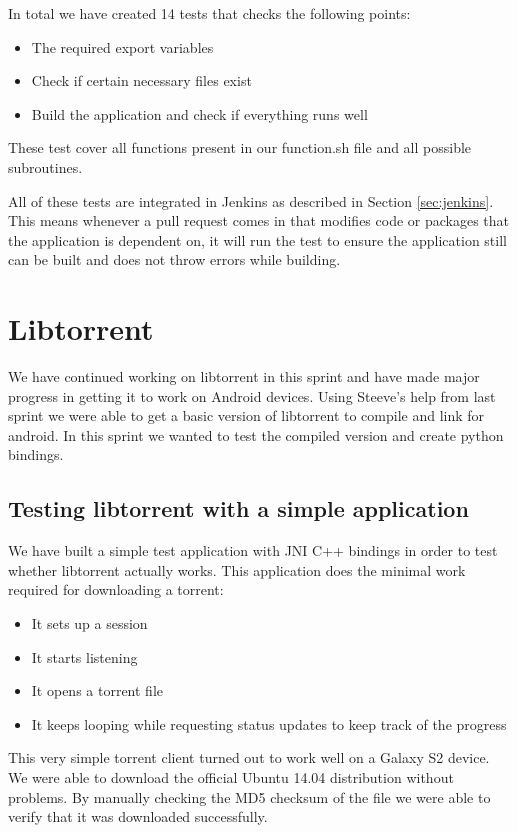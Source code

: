 		In total we have created 14 tests that checks the following points:
		
		\begin{itemize}
			\item The required export variables
			\item Check if certain necessary files exist
			\item Build the application and check if everything runs well
		\end{itemize}
		
		These test cover all functions present in our function.sh file and all possible subroutines. 
		
		All of these tests are integrated in Jenkins as described in Section \ref{sec:jenkins}. This means whenever a pull request comes in that modifies code or packages that the application is dependent on, it will run the test to ensure the application still can be built and does not throw errors while building.
	
	\section{Libtorrent}
		We have continued working on libtorrent in this sprint and have made major progress in getting it to work on Android devices. Using Steeve's help from last sprint we were able to get a basic version of libtorrent to compile and link for android. In this sprint we wanted to test the compiled version and create python bindings.
		
		\subsection{Testing libtorrent with a simple application}
			We have built a simple test application with JNI C++ bindings in order to test whether libtorrent actually works. This application does the minimal work required for downloading a torrent:
			\begin{itemize}
				\item It sets up a session
				\item It starts listening
				\item It opens a torrent file
				\item It keeps looping while requesting status updates to keep track of the progress
			\end{itemize}
			This very simple torrent client turned out to work well on a Galaxy S2 device. We were able to download the official Ubuntu 14.04 distribution without problems. By manually checking the MD5 checksum of the file we were able to verify that it was downloaded successfully.
		
